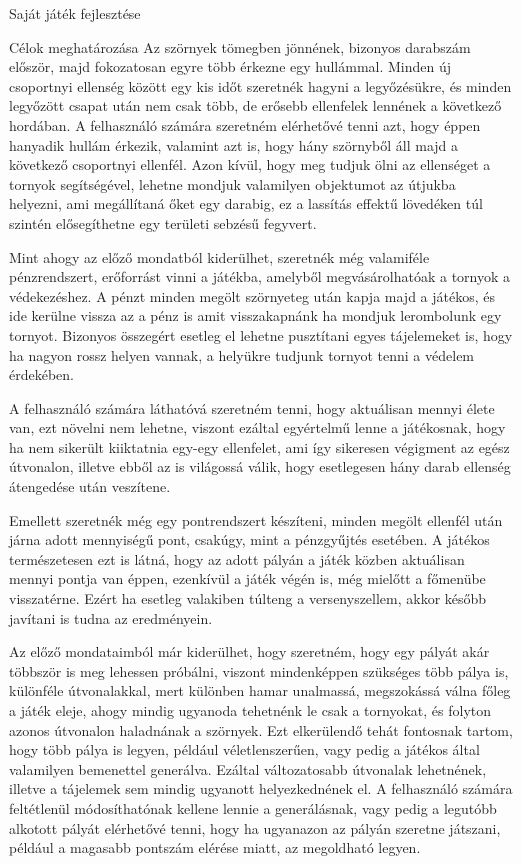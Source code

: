 \begin{MyChapter}{Saját játék fejlesztése}
\begin{MySection}{Célok meghatározása}
		Az szörnyek tömegben jönnének, bizonyos darabszám először, majd fokozatosan egyre több érkezne egy hullámmal. Minden új csoportnyi ellenség között egy kis időt szeretnék hagyni a legyőzésükre, és minden legyőzött csapat után nem csak több, de erősebb ellenfelek lennének a következő hordában. A felhasználó számára szeretném elérhetővé tenni azt, hogy éppen hanyadik hullám érkezik, valamint azt is, hogy hány szörnyből áll majd a következő csoportnyi ellenfél.
		Azon kívül, hogy meg tudjuk ölni az ellenséget a tornyok segítségével, lehetne mondjuk valamilyen objektumot az útjukba helyezni, ami megállítaná őket egy darabig, ez a lassítás effektű lövedéken túl szintén elősegíthetne egy területi sebzésű fegyvert.
		
		Mint ahogy az előző mondatból kiderülhet, szeretnék még valamiféle pénzrendszert, erőforrást vinni a játékba, amelyből megvásárolhatóak a tornyok a védekezéshez. A pénzt minden megölt szörnyeteg után kapja majd a játékos, és ide kerülne vissza az a pénz is amit visszakapnánk ha mondjuk lerombolunk egy tornyot. Bizonyos összegért esetleg el lehetne pusztítani egyes tájelemeket is, hogy ha nagyon rossz helyen vannak, a helyükre tudjunk tornyot tenni a védelem érdekében.
		
		A felhasználó számára láthatóvá szeretném tenni, hogy aktuálisan mennyi élete van, ezt növelni nem lehetne, viszont ezáltal egyértelmű lenne a játékosnak, hogy ha nem sikerült kiiktatnia egy-egy ellenfelet, ami így sikeresen végigment az egész útvonalon, illetve ebből az is világossá válik, hogy esetlegesen hány darab ellenség átengedése után veszítene.
		
		Emellett szeretnék még egy pontrendszert készíteni, minden megölt ellenfél után járna adott mennyiségű pont, csakúgy, mint a pénzgyűjtés esetében. A játékos természetesen ezt is látná, hogy az adott pályán a játék közben aktuálisan mennyi pontja van éppen, ezenkívül a játék végén is, még mielőtt a főmenübe visszatérne. Ezért ha esetleg valakiben túlteng a versenyszellem, akkor később javítani is tudna az eredményein.
		
		Az előző mondataimból már kiderülhet, hogy szeretném, hogy egy pályát akár többször is meg lehessen próbálni, viszont mindenképpen szükséges több pálya is, különféle útvonalakkal, mert különben hamar unalmassá, megszokássá válna főleg a játék eleje, ahogy mindig ugyanoda tehetnénk le csak a tornyokat, és folyton azonos útvonalon haladnának a szörnyek. Ezt elkerülendő tehát fontosnak tartom, hogy több pálya is legyen, például véletlenszerűen, vagy pedig a játékos által valamilyen bemenettel generálva. Ezáltal változatosabb útvonalak lehetnének, illetve a tájelemek sem mindig ugyanott helyezkednének el. A felhasználó számára feltétlenül módosíthatónak kellene lennie a generálásnak, vagy pedig a legutóbb alkotott pályát elérhetővé tenni, hogy ha ugyanazon az pályán szeretne játszani, például a magasabb pontszám elérése miatt, az megoldható legyen.
		

\end{MySection}
\end{MyChapter}
